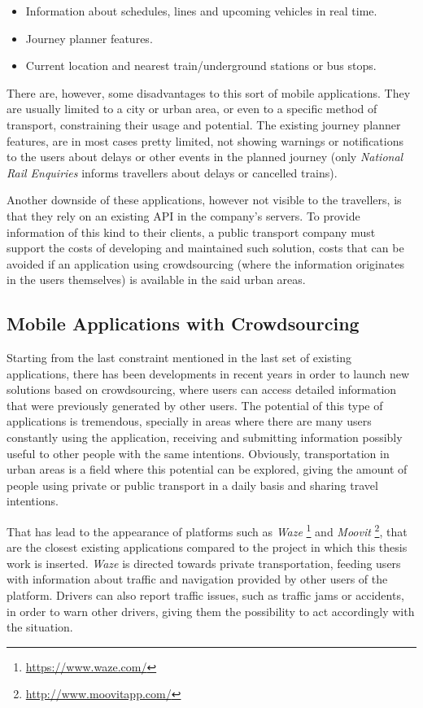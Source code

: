 \begin{itemize}
\item Information about schedules, lines and upcoming vehicles in real time.
\item Journey planner features.
\item Current location and nearest train/underground stations or bus stops.
\end{itemize}

There are, however, some disadvantages to this sort of mobile applications. They are usually limited to a city or urban area, or even to a specific method of transport, constraining their usage and potential.
The existing journey planner features, are in most cases pretty limited, not showing warnings or notifications to the users about delays or other events in the planned journey (only \emph{National Rail Enquiries} informs travellers about delays or cancelled trains).

Another downside of these applications, however not visible to the travellers, is that they rely on an existing API in the company's servers. To provide information of this kind to their clients, a public transport company must support the costs of developing and maintained such solution, costs that can be avoided if an application using crowdsourcing (where the information originates in the users themselves) is available in the said urban areas.

\subsection{Mobile Applications with Crowdsourcing}

Starting from the last constraint mentioned in the last set of existing applications, there has been developments in recent years in order to launch new solutions based on crowdsourcing, where users can access detailed information that were previously generated by other users. The potential of this type of applications is tremendous, specially in areas where there are many users  constantly using the application, receiving and submitting information possibly useful to other people with the same intentions. 
Obviously, transportation in urban areas is a field where this potential can be explored, giving the amount of people using private or public transport in a daily basis and sharing travel intentions.

That has lead to the appearance of platforms such as \emph{Waze} \footnote{\url{https://www.waze.com/}} and \emph{Moovit} \footnote{\url{http://www.moovitapp.com/}},  that are the closest existing applications compared to the project in which this thesis work is inserted.
\emph{Waze} is directed towards private transportation, feeding users with information about traffic and navigation provided by other users of the platform. Drivers can also report traffic issues, such as traffic jams or accidents, in order to warn other drivers, giving them the possibility to act accordingly with the situation.

